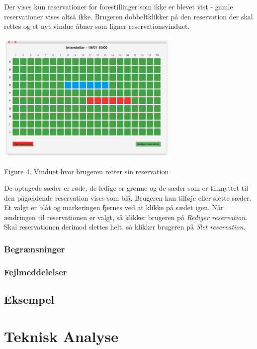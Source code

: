 \documentclass[final]{rapport1}
\begin{document}
Der vises kun reservationer for forestillinger som ikke er blevet vist - gamle reservationer vises altså ikke. Brugeren dobbeltklikker på den reservation der skal rettes og et nyt vindue åbner som ligner reservationsvinduet. \\

\begin{picture}

\includegraphics[width=250pt]{5.png}

\end{picture}
\begin{center}
\tiny Figure 4. Vinduet hvor brugeren retter sin reservation
\end{center}

De optagede sæder er røde, de ledige er grønne og de sæder som er tilknyttet til den pågældende reservation vises som blå. Brugeren kan tilføje eller slette sæder. Et valgt er blåt og markeringen fjernes ved at klikke på sædet igen. Når ændringen til reservationen er valgt, så klikker brugeren på \emph{Rediger reservation}. Skal reservationen derimod slettes helt, så klikker brugeren på \emph{Slet reservation}.

\subsection{Begrænsninger}
\subsection{Fejlmeddelelser}
\section{Eksempel}

\chapter{Teknisk Analyse}
\end{document}
